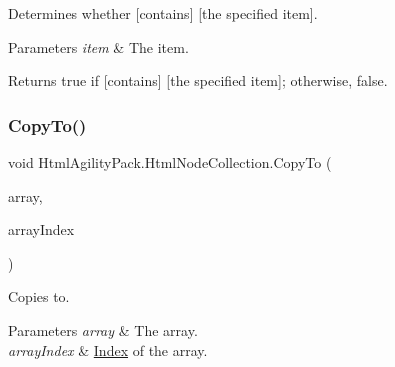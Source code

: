 Determines whether \mbox{[}contains\mbox{]} \mbox{[}the specified item\mbox{]}. 


\begin{DoxyParams}{Parameters}
{\em item} & The item.\\
\hline
\end{DoxyParams}
\begin{DoxyReturn}{Returns}
{\ttfamily true} if \mbox{[}contains\mbox{]} \mbox{[}the specified item\mbox{]}; otherwise, {\ttfamily false}.
\end{DoxyReturn}
\mbox{\label{class_html_agility_pack_1_1_html_node_collection_a88a914ed380705b93c9e600796442902}} 
\subsubsection{\texorpdfstring{Copy\+To()}{CopyTo()}}
{\footnotesize\ttfamily void Html\+Agility\+Pack.\+Html\+Node\+Collection.\+Copy\+To (\begin{DoxyParamCaption}\item[{\hyperlink{class_html_agility_pack_1_1_html_node}{Html\+Node} \mbox{[}$\,$\mbox{]}}]{array,  }\item[{int}]{array\+Index }\end{DoxyParamCaption})\hspace{0.3cm}{\ttfamily [inline]}}



Copies to. 


\begin{DoxyParams}{Parameters}
{\em array} & The array.\\
\hline
{\em array\+Index} & \hyperlink{class_index}{Index} of the array.\\
\hline
\end{DoxyParams}
\mbox{\label{class_html_agility_pack_1_1_html_node_collection_aa8d23d4ca8f0e1e908bcfb3966308b6b}} 
